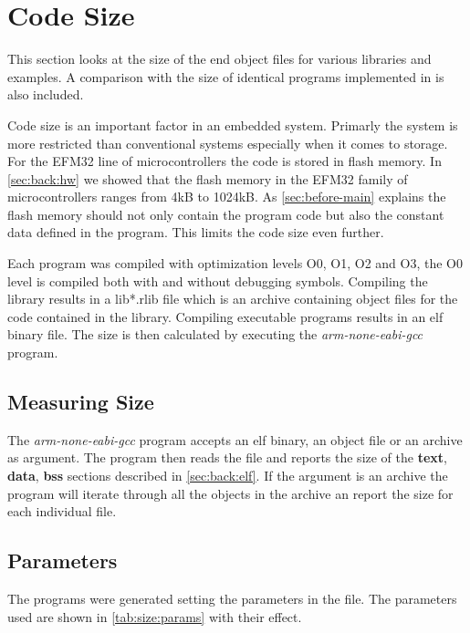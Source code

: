 \section{Code Size}

This section looks at the size of the end object files for various {\rust} libraries and examples.
A comparison with the size of identical programs implemented in {\C} is also included.

Code size is an important factor in an embedded system.
Primarly the system is more restricted than conventional systems especially when it comes to storage.
For the EFM32 line of microcontrollers the code is stored in flash memory.
In \autoref{sec:back:hw} we showed that the flash memory in the EFM32 family of microcontrollers ranges from 4kB to 1024kB.
As \autoref{sec:before-main} explains the flash memory should not only contain the program code but also the constant data defined in the program.
This limits the code size even further.

Each program was compiled with optimization levels O0, O1, O2 and O3, the O0 level is compiled both with and without debugging symbols.
Compiling the library results in a lib*.rlib file which is an archive containing object files for the code contained in the library.
Compiling executable programs results in an elf binary file.
The size is then calculated by executing the \emph{arm-none-eabi-gcc} program.

\subsection{Measuring Size}

The \emph{arm-none-eabi-gcc} program accepts an elf binary, an object file or an archive as argument.
The program then reads the file and reports the size of the \textbf{text}, \textbf{data}, \textbf{bss} sections described in \autoref{sec:back:elf}.
If the argument is an archive the program will iterate through all the objects in the archive an report the size for each individual file.

\subsection{Parameters}
\label{sec:size:params}
The programs were generated setting the parameters in the  file.
The parameters used are shown in \autoref{tab:size:params} with their effect.

